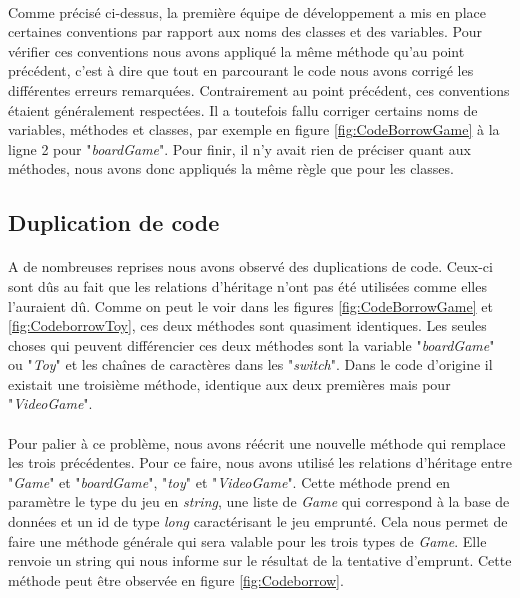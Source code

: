     \paragraph{}
    Comme précisé ci-dessus, la première équipe de développement a mis en place certaines conventions par rapport aux noms des classes et des variables. Pour vérifier ces conventions nous avons appliqué la même méthode qu'au point précédent, c'est à dire que tout en parcourant le code nous avons corrigé les différentes erreurs remarquées. Contrairement au point précédent, ces conventions étaient généralement respectées. Il a toutefois fallu corriger certains noms de variables, méthodes et classes, par exemple en figure \ref{fig:CodeBorrowGame} à la ligne 2 pour "\textit{boardGame}". Pour finir, il n'y avait rien de préciser quant aux méthodes, nous avons donc appliqués la même règle que pour les classes.
    
\subsection{Duplication de code}

    \paragraph{}
    A de nombreuses reprises nous avons observé des duplications de code. Ceux-ci sont dûs au fait que les relations d'héritage n'ont pas été utilisées comme elles l'auraient dû. Comme on peut le voir dans les figures \ref{fig:CodeBorrowGame} et \ref{fig:CodeborrowToy}, ces deux méthodes sont quasiment identiques. Les seules choses qui peuvent différencier ces deux méthodes sont la variable "\textit{boardGame}" ou "\textit{Toy}" et les chaînes de caractères dans les "\textit{switch}". Dans le code d'origine il existait une troisième méthode, identique aux deux premières mais pour "\textit{VideoGame}".
    
    \paragraph{}
    Pour palier à ce problème, nous avons réécrit une nouvelle méthode qui remplace les trois précédentes. Pour ce faire, nous avons utilisé les relations d'héritage entre "\textit{Game}" et "\textit{boardGame}", "\textit{toy}" et "\textit{VideoGame}". Cette méthode prend en paramètre le type du jeu en \textit{string}, une liste de \textit{Game} qui correspond à la base de données et un id de type \textit{long} caractérisant le jeu emprunté. Cela nous permet de faire une méthode générale qui sera valable pour les trois types de \textit{Game}. Elle renvoie un string qui nous informe sur le résultat de la tentative d'emprunt. Cette méthode peut être observée en figure \ref{fig:Codeborrow}.
    
